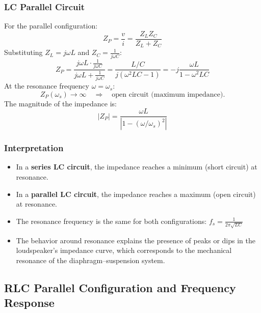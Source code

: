 \subsubsection{LC Parallel Circuit}

For the parallel configuration:
\[
Z_P = \frac{v}{i} = \frac{Z_L Z_C}{Z_L + Z_C}
\]
Substituting \( Z_L = j \omega L \) and \( Z_C = \frac{1}{j \omega C} \):
\[
Z_P = \frac{j \omega L \cdot \frac{1}{j \omega C}}{j \omega L + \frac{1}{j \omega C}} = \frac{L / C}{j (\omega^2 L C - 1)} = - j \frac{\omega L}{1 - \omega^2 L C}
\]
At the resonance frequency \( \omega = \omega_s \):
\[
Z_P(\omega_s) \rightarrow \infty \quad \Rightarrow \quad \text{open circuit (maximum impedance).}
\]
The magnitude of the impedance is:
\[
|Z_P| = \frac{\omega L}{|1 - (\omega / \omega_s)^2|}
\]


\subsubsection{Interpretation}

\begin{itemize}
    \item In a \textbf{series LC circuit}, the impedance reaches a minimum (short circuit) at resonance.  
    \item In a \textbf{parallel LC circuit}, the impedance reaches a maximum (open circuit) at resonance.  
    \item The resonance frequency is the same for both configurations: $ f_s = \frac{1}{2 \pi \sqrt{L C}} $
    \item The behavior around resonance explains the presence of peaks or dips in the loudspeaker’s impedance curve, which corresponds to the mechanical resonance of the diaphragm–suspension system.
\end{itemize}


\subsection{RLC Parallel Configuration and Frequency Response}


